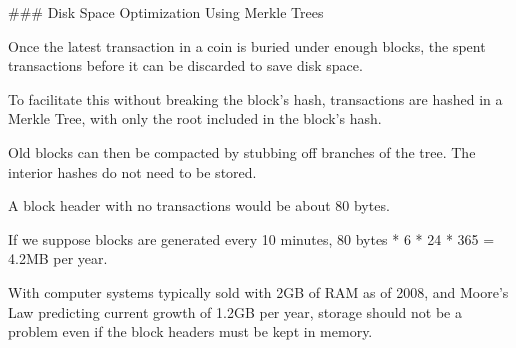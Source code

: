 ### Disk Space Optimization Using Merkle Trees

Once the latest transaction in a coin is buried under enough blocks, the spent transactions before it can be discarded to save disk space.

To facilitate this without breaking the block's hash, transactions are hashed in a Merkle Tree, with only the root included in the block's hash.

Old blocks can then be compacted by stubbing off branches of the tree. The interior hashes do not need to be stored.

A block header with no transactions would be about 80 bytes.

If we suppose blocks are generated every 10 minutes, 80 bytes * 6 * 24 * 365 = 4.2MB per year.

With computer systems typically sold with 2GB of RAM as of 2008, and Moore's Law predicting current growth of 1.2GB per year, storage should not be a problem even if the block headers must be kept in memory.